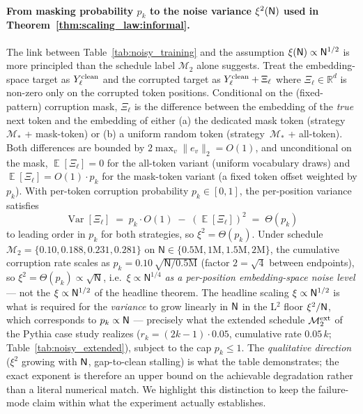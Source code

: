 \documentclass[11pt]{article}
\theoremstyle{plain}
\newcommand{\R}{\mathbb{R}}
\DeclareMathOperator*{\E}{{\mathbb{E}}}
\DeclareMathOperator*{\var}{\mathrm{Var}}
\begin{document}
\paragraph{From masking probability $p_k$ to the noise variance $\xi^2({\sf N})$ used in Theorem~\ref{thm:scaling_law:informal}.}
The link between Table~\ref{tab:noisy_training} and the assumption $\xi({\sf N})\propto {\sf N}^{1/2}$ is more principled than the schedule label $\mathcal{M}_2$ alone suggests. Treat the embedding-space target as $Y_{\ell}^{\rm clean}$ and the corrupted target as $Y_\ell^{\rm clean}+ \Xi_\ell$ where $\Xi_\ell\in\R^d$ is non-zero only on the corrupted token positions. Conditional on the (fixed-pattern) corruption mask, $\Xi_\ell$ is the difference between the embedding of the {\it true} next token and the embedding of either (a) the dedicated mask token (strategy~$\mathcal{M}_*$ + mask-token) or (b) a uniform random token (strategy~$\mathcal{M}_*$ + all-token). Both differences are bounded by $2\max_v \|e_v\|_2 = O(1)$, and unconditional on the mask, $\E[\Xi_\ell]=0$ for the all-token variant (uniform vocabulary draws) and $\E[\Xi_\ell]=O(1)\cdot p_k$ for the mask-token variant (a fixed token offset weighted by $p_k$).
With per-token corruption probability $p_k\in[0,1]$, the per-position variance satisfies
\[
\var[\Xi_\ell] \;=\; p_k\cdot O(1) \;-\; (\E[\Xi_\ell])^2 \;=\; \Theta(p_k)
\]
to leading order in $p_k$ for both strategies, so $\xi^2 = \Theta(p_k)$. Under schedule $\mathcal{M}_2 = \{0.10, 0.188, 0.231, 0.281\}$ on $\mathsf{N}\in\{0.5\text{M}, 1\text{M}, 1.5\text{M}, 2\text{M}\}$, the cumulative corruption rate scales as $p_k = 0.10\,\sqrt{\mathsf{N}/0.5\text{M}}$ (factor $2=\sqrt 4$ between endpoints), so $\xi^2 = \Theta(p_k)\propto \sqrt{\mathsf{N}}$, i.e.\ $\xi\propto \mathsf{N}^{1/4}$ {\it as a per-position embedding-space noise level} --- not the $\xi\propto {\sf N}^{1/2}$ of the headline theorem. The headline scaling $\xi\propto {\sf N}^{1/2}$ is what is required for the {\it variance} to grow linearly in ${\sf N}$ in the L$^2$ floor $\xi^2/{\sf N}$, which corresponds to $p_k\propto {\sf N}$ --- precisely what the extended schedule $\mathcal{M}_2^{\rm ext}$ of the Pythia case study realizes ($r_k=(2k-1)\cdot 0.05$, cumulative rate $0.05\,k$; Table~\ref{tab:noisy_extended}), subject to the cap $p_k\le 1$. The {\it qualitative direction} ($\xi^2$ growing with ${\sf N}$, gap-to-clean stalling) is what the table demonstrates; the exact exponent is therefore an upper bound on the achievable degradation rather than a literal numerical match. We highlight this distinction to keep the failure-mode claim within what the experiment actually establishes.
\end{document}
